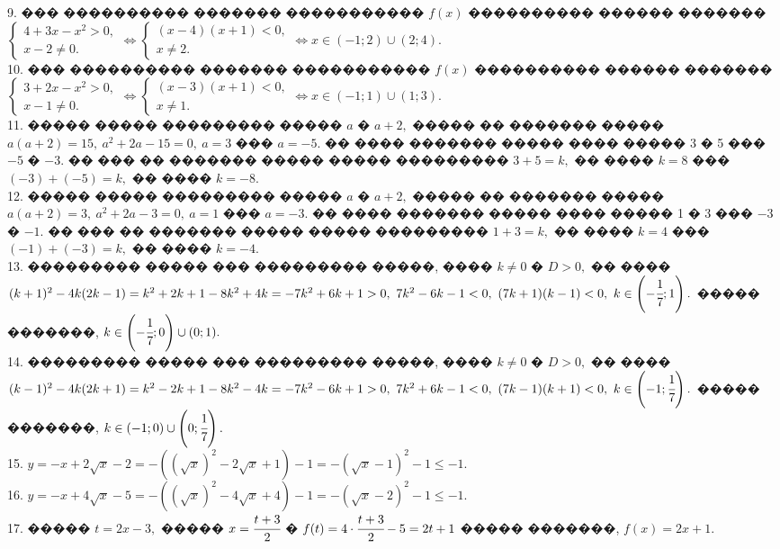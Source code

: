 \documentclass[12pt]{article}
\begin{document}
9. ��� ���������� ������� ����������� $f(x)$ ���������� ������ ������� $\begin{cases} 4+3x-x^2>0,\\ x-2\neq0.\end{cases}\Leftrightarrow
\begin{cases} (x-4)(x+1)<0,\\ x\neq2.\end{cases}\Leftrightarrow x\in(-1;2)\cup(2;4).$\\
10. ��� ���������� ������� ����������� $f(x)$ ���������� ������ ������� $\begin{cases} 3+2x-x^2>0,\\ x-1\neq0.\end{cases}\Leftrightarrow
\begin{cases} (x-3)(x+1)<0,\\ x\neq1.\end{cases}\Leftrightarrow x\in(-1;1)\cup(1;3).$\\
11. ����� ����� ��������� ����� $a$ � $a+2,$ ����� �� ������� ����� $a(a+2)=15,\ a^2+2a-15=0,\ a=3$ ��� $a=-5.$ �� ���� ������� ����� ���� ����� 3 � 5 ��� $-5$ � $-3.$ �� ��� �� ������� ����� ����� ��������� $3+5=k,$ �� ���� $k=8$ ��� $(-3)+(-5)=k,$ �� ���� $k=-8.$\\
12. ����� ����� ��������� ����� $a$ � $a+2,$ ����� �� ������� ����� $a(a+2)=3,\ a^2+2a-3=0,\ a=1$ ��� $a=-3.$ �� ���� ������� ����� ���� ����� 1 � 3 ��� $-3$ � $-1.$ �� ��� �� ������� ����� ����� ��������� $1+3=k,$ �� ���� $k=4$ ��� $(-1)+(-3)=k,$ �� ���� $k=-4.$\\
13. ��������� ����� ��� ��������� �����, ���� $k\neq0$ � $D>0,$ �� ���� $(k+1)^2-4k(2k-1)=k^2+2k+1-8k^2+4k=-7k^2+6k+1>0,\ 7k^2-6k-1<0,\ (7k+1)(k-1)<0,\ k\in\left(-\cfrac{1}{7};1\right).$ ����� �������, $k\in\left(-\cfrac{1}{7};0\right)\cup(0;1).$\\
14. ��������� ����� ��� ��������� �����, ���� $k\neq0$ � $D>0,$ �� ���� $(k-1)^2-4k(2k+1)=k^2-2k+1-8k^2-4k=-7k^2-6k+1>0,\ 7k^2+6k-1<0,\ (7k-1)(k+1)<0,\ k\in\left(-1;\cfrac{1}{7}\right).$ ����� �������, $k\in\left(-1;0\right)\cup\left(0;\cfrac{1}{7}\right).$\\
15. $y=-x+2\sqrt{x}-2=-((\sqrt{x})^2-2\sqrt{x}+1)-1=-(\sqrt{x}-1)^2-1\leqslant-1.$\\
16. $y=-x+4\sqrt{x}-5=-((\sqrt{x})^2-4\sqrt{x}+4)-1=-(\sqrt{x}-2)^2-1\leqslant-1.$\\
17. ����� $t=2x-3,$ ����� $x=\cfrac{t+3}{2}$ � $f(t)=4\cdot\cfrac{t+3}{2}-5=2t+1$ ����� �������, $f(x)=2x+1.$\\
\end{document}
